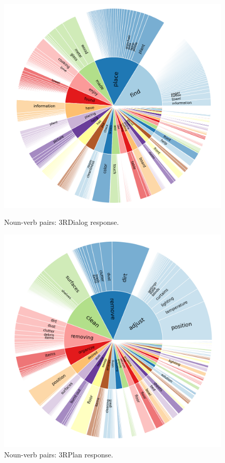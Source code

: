 \begin{figure}[t!]
    \centering
    \begin{minipage}[b]{0.45\textwidth}
        \includegraphics[width=1\textwidth]{figs/Rscan_dialogue_noun_verb_response_stat.png}
        \caption{Noun-verb pairs: 3RDialog response.}
        \label{fig:RscanDialog_noun_verb_response}
    \end{minipage}
    \hfill
    \begin{minipage}[b]{0.433\textwidth}
        \includegraphics[width=1\textwidth]{figs/Rscan_plan_noun_verb_response_stat.png}
        \caption{Noun-verb pairs: 3RPlan response.}
        \label{fig:RscanPlan_noun_verb_response}
    \end{minipage}
\end{figure}   

